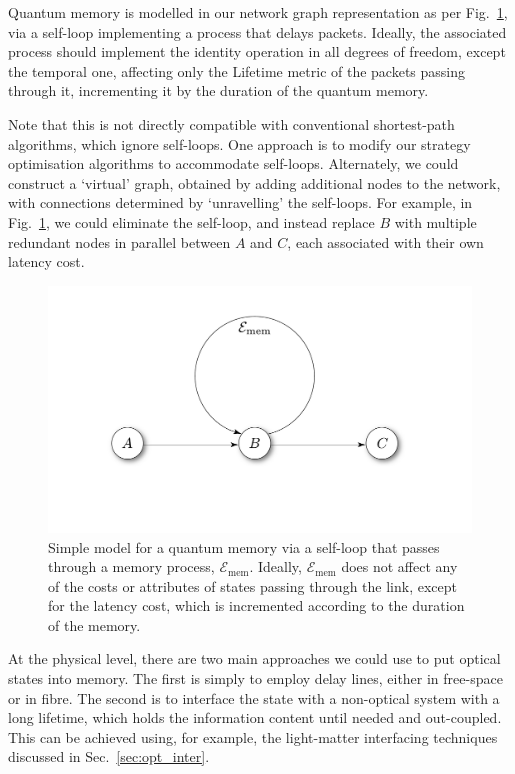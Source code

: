 \documentclass[aps,rmp,twocolumn,amsmath,amssymb,nofootinbib,superscriptaddress,longbibliography,floatfix]{revtex4-1}
\begin{document}
Quantum memory is modelled in our network graph representation as per Fig.~\ref{fig:memory}, via a self-loop implementing a process that delays packets. Ideally, the associated process should implement the identity operation in all degrees of freedom, except the temporal one, affecting only the {\sc Lifetime} metric of the packets passing through it, incrementing it by the duration of the quantum memory.

Note that this is not directly compatible with conventional shortest-path algorithms, which ignore self-loops. One approach is to modify our strategy optimisation algorithms to accommodate self-loops. Alternately, we could construct a `virtual' graph, obtained by adding additional nodes to the network, with connections determined by `unravelling' the self-loops. For example, in Fig.~\ref{fig:memory}, we could eliminate the self-loop, and instead replace $B$ with multiple redundant nodes in parallel between $A$ and $C$, each associated with their own latency cost.

\begin{figure}[!htb]
\includegraphics[width=0.7\columnwidth]{memory}
\caption{Simple model for a quantum memory via a self-loop that passes through a memory process, $\mathcal{E}_\mathrm{mem}$. Ideally, $\mathcal{E}_\mathrm{mem}$ does not affect any of the costs or attributes of states passing through the link, except for the latency cost, which is incremented according to the duration of the memory.} \label{fig:memory}
\end{figure}

At the physical level, there are two main approaches we could use to put optical states into memory. The first is simply to employ delay lines, either in free-space or in fibre. The second is to interface the state with a non-optical system with a long lifetime, which holds the information content until needed and out-coupled. This can be achieved using, for example, the light-matter interfacing techniques discussed in Sec.~\ref{sec:opt_inter}.
\end{document}
